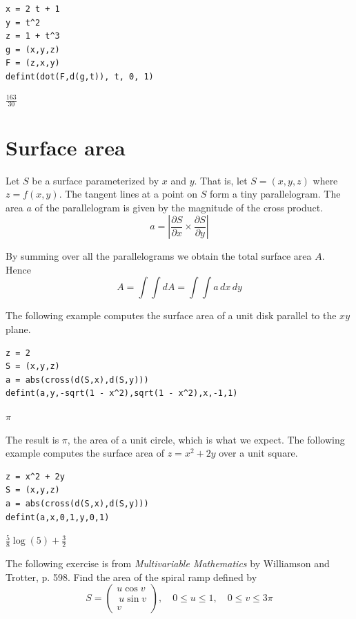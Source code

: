 \documentclass[12pt]{article}
\begin{document}
{\color{blue}
\begin{verbatim}
x = 2 t + 1
y = t^2
z = 1 + t^3
g = (x,y,z)
F = (z,x,y)
defint(dot(F,d(g,t)), t, 0, 1)
\end{verbatim}}

$\displaystyle \tfrac{163}{30}$

\newpage

\section{Surface area}

Let $S$ be a surface parameterized by $x$ and $y$.
That is, let $S=(x,y,z)$ where $z=f(x,y)$.
The tangent lines at a point on $S$ form a tiny parallelogram.
The area $a$ of the parallelogram is given by the magnitude of the cross product.
\begin{equation*}
a=\left|\frac{\partial S}{\partial x}\times\frac{\partial S}{\partial y}\right|
\end{equation*}

By summing over all the parallelograms we obtain the total surface area $A$.
Hence
\begin{equation*}
A=\int\int dA=\int\int a\,dx\,dy
\end{equation*}

The following example computes the surface area of a unit disk
parallel to the $xy$ plane.

{\color{blue}
\begin{verbatim}
z = 2
S = (x,y,z)
a = abs(cross(d(S,x),d(S,y)))
defint(a,y,-sqrt(1 - x^2),sqrt(1 - x^2),x,-1,1)
\end{verbatim}
}

$\displaystyle \pi$

\bigskip
The result is $\pi$, the area of a unit circle, which is what we expect.
The following example computes the surface area of $z=x^2+2y$ over
a unit square.

{\color{blue}
\begin{verbatim}
z = x^2 + 2y
S = (x,y,z)
a = abs(cross(d(S,x),d(S,y)))
defint(a,x,0,1,y,0,1)
\end{verbatim}
}

$\displaystyle \tfrac{5}{8}\log(5)+\tfrac{3}{2}$

\bigskip
The following exercise is from
{\it Multivariable Mathematics} by Williamson and Trotter, p. 598.
Find the area of the spiral ramp defined by
\begin{equation*}
S=\begin{pmatrix}u\cos v\\\ u\sin v\\ v\end{pmatrix},\quad 0\le u\le1,\quad 0\le v\le3\pi
\end{equation*}
\end{document}
